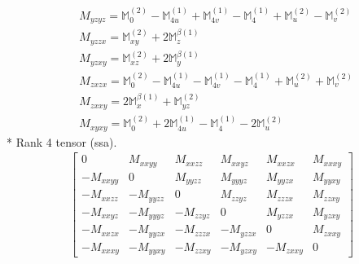 \documentclass[fleqn,8pt,landscape]{jsarticle}
\begin{document}
\begin{align*}
& M_{yzyz} = \mathbb{M}_{0}^{(2)} - \mathbb{M}_{4u}^{(1)} + \mathbb{M}_{4v}^{(1)} - \mathbb{M}_{4}^{(1)} + \mathbb{M}_{u}^{(2)} - \mathbb{M}_{v}^{(2)} \\
& M_{yzzx} = \mathbb{M}_{xy}^{(2)} + 2 \mathbb{M}_{z}^{\beta(1)} \\
& M_{yzxy} = \mathbb{M}_{xz}^{(2)} + 2 \mathbb{M}_{y}^{\beta(1)} \\
& M_{zxzx} = \mathbb{M}_{0}^{(2)} - \mathbb{M}_{4u}^{(1)} - \mathbb{M}_{4v}^{(1)} - \mathbb{M}_{4}^{(1)} + \mathbb{M}_{u}^{(2)} + \mathbb{M}_{v}^{(2)} \\
& M_{zxxy} = 2 \mathbb{M}_{x}^{\beta(1)} + \mathbb{M}_{yz}^{(2)} \\
& M_{xyxy} = \mathbb{M}_{0}^{(2)} + 2 \mathbb{M}_{4u}^{(1)} - \mathbb{M}_{4}^{(1)} - 2 \mathbb{M}_{u}^{(2)}
\end{align*}
* Rank 4 tensor (ssa).
\begin{align*}
\begin{bmatrix} 0 & M_{xxyy} & M_{xxzz} & M_{xxyz} & M_{xxzx} & M_{xxxy} \\ - M_{xxyy} & 0 & M_{yyzz} & M_{yyyz} & M_{yyzx} & M_{yyxy} \\ - M_{xxzz} & - M_{yyzz} & 0 & M_{zzyz} & M_{zzzx} & M_{zzxy} \\ - M_{xxyz} & - M_{yyyz} & - M_{zzyz} & 0 & M_{yzzx} & M_{yzxy} \\ - M_{xxzx} & - M_{yyzx} & - M_{zzzx} & - M_{yzzx} & 0 & M_{zxxy} \\ - M_{xxxy} & - M_{yyxy} & - M_{zzxy} & - M_{yzxy} & - M_{zxxy} & 0 \end{bmatrix}
\end{align*}
\end{document}
